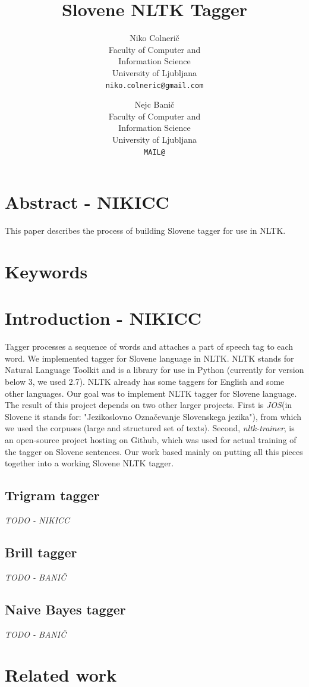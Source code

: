 \documentclass[11pt, conference, compsocconf]{IEEEtran}
\title{\textbf{Slovene NLTK Tagger}}
\author{
	Niko Colnerič \\
	\footnotesize Faculty of Computer and \\
	\footnotesize Information Science \\
	\footnotesize University of Ljubljana \\
	\footnotesize \texttt{niko.colneric@gmail.com} \\
	\and
	Nejc Banič \\
	\footnotesize Faculty of Computer and \\
	\footnotesize Information Science \\
	\footnotesize University of Ljubljana \\
	\footnotesize \texttt{MAIL@} \\
}
\begin{document}
\maketitle
\thispagestyle{empty}

\section*{Abstract - NIKICC}
This paper describes the process of building Slovene tagger for use in NLTK.

\section*{Keywords}

\section{Introduction - NIKICC}
Tagger processes a sequence of words and attaches a part of speech tag to each word. We implemented tagger for Slovene language in NLTK. NLTK stands for Natural Language Toolkit and is a library for use in Python (currently for version below 3, we used 2.7). NLTK already has some taggers for English and some other languages. Our goal was to implement NLTK tagger for Slovene language. The result of this project depends on two other larger projects. First is \textit{JOS}\cite{JOS}(in Slovene it stands for: "Jezikoslovno Označevanje Slovenskega jezika"), from which we used the corpuses (large and structured set of texts). Second, \textit{nltk-trainer}\cite{nltk-trainer}, is an open-source project hosting on Github, which was used for actual training of the tagger on Slovene sentences. Our work based mainly on putting all this pieces together into a working Slovene NLTK tagger.

\subsection{Trigram tagger}
\textit{TODO - NIKICC}
\subsection{Brill tagger}
\textit{TODO - BANIČ}
\subsection{Naive Bayes tagger}
\textit{TODO - BANIČ}

\section{Related work}
\end{document}
